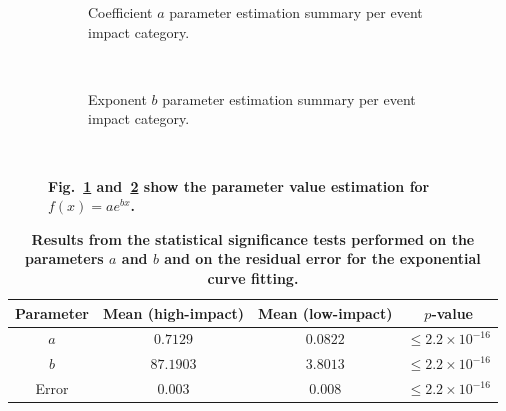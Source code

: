 \documentclass[10pt,letterpaper]{article}
\newcommand{\newtext}[1]{{\leavevmode\color{blue}#1}}
\begin{document}
\begin{figure}
  \centering
  \begin{subfigure}{.5\textwidth}
    \caption{Coefficient $a$ parameter estimation summary per event impact category. %
    }
    \label{fig:param-a}
  \end{subfigure}%
  ~%
  \begin{subfigure}{.5\textwidth}
    \caption{Exponent $b$ parameter estimation summary per event impact category. %
    }
    \label{fig:param-b}
  \end{subfigure}%
  ~ %

  \caption{\textbf{Fig.~\ref{fig:param-a} and~\ref{fig:param-b} show the parameter value estimation for $f(x)=ae^{bx}$.}}
  \label{fig:param_est}
\end{figure}


\begin{table}
  \centering
  \begin{tabularx}{\textwidth}{cccc}
    \toprule
    \textbf{Parameter} & \textbf{Mean (high-impact)} & \textbf{Mean (low-impact)} & \textbf{$p$-value} \\ \midrule
    $a$ & $0.7129$ & $0.0822$ & $\leq2.2\times 10^{-16}$  \\ 
    $b$ & $87.1903$ & $3.8013$ &$\leq2.2\times 10^{-16}$ \\
    Error & $0.003$ & $0.008$ & $\leq2.2\times 10^{-16}$ \\ \bottomrule
  \end{tabularx}
  \caption{\textbf{%
        Results from the statistical significance tests performed on the parameters $a$ and $b$
    and on the residual error for the exponential curve fitting.%
    }}
  \label{tab:curve_fitting}
\end{table}
\end{document}
